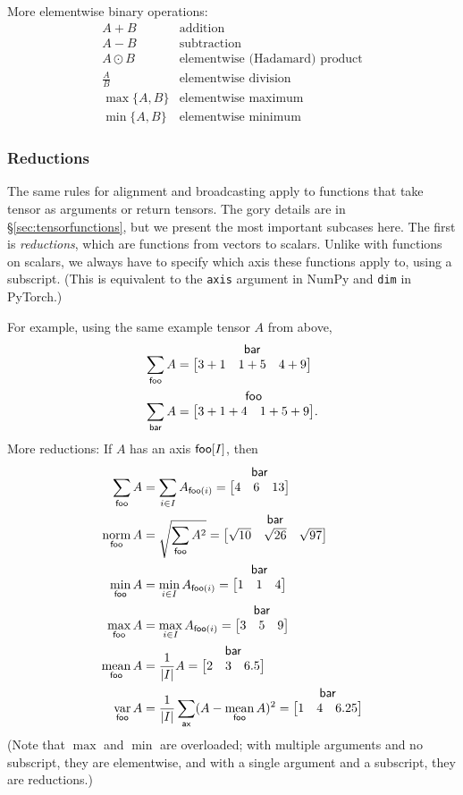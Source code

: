 \documentclass{article}
\makeatletter
\newcommand{\nmatrix}[3]{\name{#1}\begin{array}[b]{@{}c@{}}\name{#2}\\\begin{bmatrix}#3\end{bmatrix}\end{array}}
\makeatother
\begin{document}
More elementwise binary operations:
\[\begin{array}{cl}
A+B & \text{addition} \\
A-B & \text{subtraction} \\
A\odot B & \text{elementwise (Hadamard) product} \\
\displaystyle\frac{A}{B} & \text{elementwise division} \\[1.2ex]
\max \{A, B\} & \text{elementwise maximum} \\
\min \{A, B\} & \text{elementwise minimum}
\end{array}\]

\subsubsection{Reductions}

The same rules for alignment and broadcasting apply to functions that take tensor as arguments or return tensors. The gory details are in \S\ref{sec:tensorfunctions}, but we present the most important subcases here. The first is \emph{reductions}, which are functions from vectors to scalars. Unlike with functions on scalars, we always have to specify which axis these functions apply to, using a subscript. (This is equivalent to the \verb|axis| argument in NumPy and \verb|dim| in PyTorch.)

For example, using the same example tensor $A$ from above,
\begin{align*}
\nsum{foo} A &= \nmatrix{}{bar}{
  3+1 & 1+5 & 4+9
} \\
\nsum{bar} A &= \nmatrix{}{foo}{
  3+1+4 & 1+5+9
}.
\end{align*}
More reductions: If $A$ has an axis $\mathsf{foo}[I]$, then
\begin{align*}
  \nsum{foo} A &= \sum_{i \in I} A_{\nidx{foo}{i}} = \nmatrix{}{bar}{4 & 6 & 13} \\
  \nfun{foo}{norm} A &= \sqrt{\nsum{foo} A^2} = \nmatrix{}{bar}{\sqrt{10} & \sqrt{26} & \sqrt{97}} \\
  \nfun{foo}{min} A &= \min_{i \in I} A_{\nidx{foo}{i}} = \nmatrix{}{bar}{1 & 1 & 4} \\
  \nfun{foo}{max} A &= \max_{i \in I} A_{\nidx{foo}{i}} = \nmatrix{}{bar}{3 & 5 & 9} \\
  \nfun{foo}{mean} A &= \frac{1}{|I|} A = \nmatrix{}{bar}{2 & 3 & 6.5} \\
  \nfun{foo}{var} A &= \frac1{|I|} \nsum{ax} (A - \nfun{foo}{mean} A)^2 = \nmatrix{}{bar}{1 & 4 & 6.25}
\end{align*}
(Note that $\max$ and $\min$ are overloaded; with multiple arguments and no subscript, they are elementwise, and with a single argument and a subscript, they are reductions.)
\end{document}
